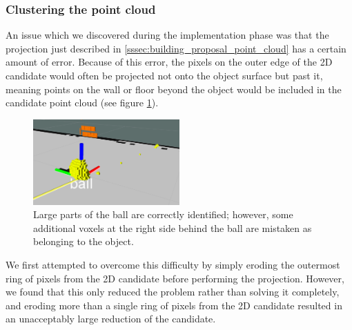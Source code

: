 


\subsubsection{Clustering the point cloud}

An issue which we discovered during the implementation phase was that the projection just described in \ref{sssec:building_proposal_point_cloud} has a certain amount of error.
Because of this error, the pixels on the outer edge of the 2D candidate would often be projected not onto the object surface but past it, meaning points on the wall or floor beyond the object would be included in the candidate point cloud (see figure \ref{fig:rays}). 

\begin{figure}[h!]
	\begin{center}
		\includegraphics[width=0.5\textwidth]{src/rays2.png}
		\caption{Large parts of the ball are correctly identified; however, some additional voxels at the right side behind the ball are mistaken as belonging to the object.}
		\label{fig:rays}
	\end{center}
\end{figure}

We first attempted to overcome this difficulty by simply eroding the outermost ring of pixels from the 2D candidate before performing the projection.
However, we found that this only reduced the problem rather than solving it completely, and eroding more than a single ring of pixels from the 2D candidate resulted in an unacceptably large reduction of the candidate.

